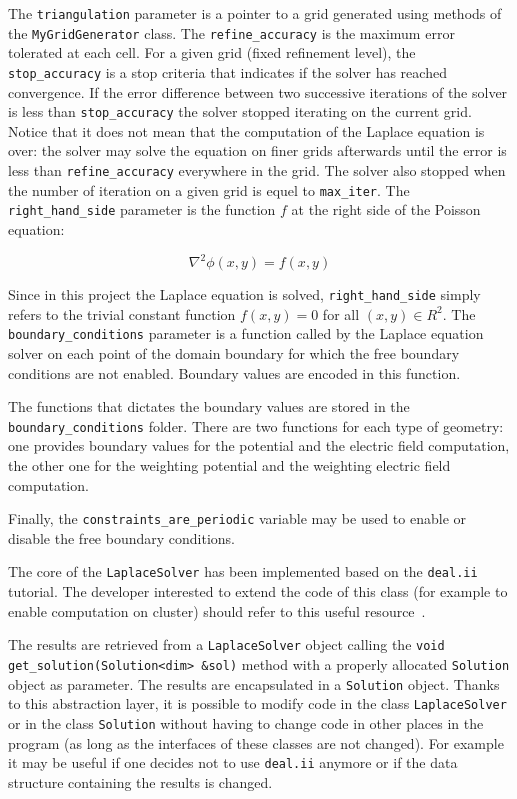\documentclass[11pt]{article}
\begin{document}
		The \texttt{triangulation} parameter is a pointer to a grid generated using methods of
		the \texttt{MyGridGenerator} class. The \texttt{refine\_accuracy} is the maximum
		error tolerated at each cell. For a given grid (fixed refinement level),
		the \texttt{stop\_accuracy}  is a stop criteria that indicates if the solver has
		reached convergence. If the error difference between two successive iterations
		of the solver is less than \texttt{stop\_accuracy} the solver stopped iterating
		on the current grid. Notice that it does not mean that the computation of the
		Laplace equation is over: the solver may solve the equation on finer grids
		afterwards until the error is less than \texttt{refine\_accuracy} everywhere
		in the grid. The solver also stopped when the number of iteration on a given
		grid is equel to \texttt{max\_iter}. The \texttt{right\_hand\_side} parameter
		is the function $f$ at the right side of the Poisson equation:

		\[\nabla^2 \phi(x,y) = f(x,y)\]

		Since in this project the Laplace equation is solved, \texttt{right\_hand\_side}
		simply refers to the trivial constant function $f(x,y) = 0$ for all $(x,y) \in R^2$.
		The \texttt{boundary\_conditions} parameter is a function called by the Laplace
		equation solver on each point of the domain boundary for which the free
		boundary conditions are not enabled. Boundary values are encoded in this function.

		The functions that dictates the boundary values are stored in the
		\texttt{boundary\_conditions} folder. There are two functions for each
		type of geometry: one provides boundary values for the potential and the electric
		field computation, the other one for the weighting potential and the weighting
		electric field computation.

		Finally, the \texttt{constraints\_are\_periodic} variable may be used to
		enable or disable the free boundary conditions.

		The core of the \texttt{LaplaceSolver} has been implemented based on the
		\texttt{deal.ii} tutorial. The developer interested to extend the code of this
		class (for example to enable computation on cluster) should refer to this
		useful resource~\cite{deal.iituto}.

		The results are retrieved from a \texttt{LaplaceSolver} object
		calling the \newline\lstinline{void get_solution(Solution<dim> &sol)}
		method with a properly allocated \texttt{Solution} object as parameter.
		The results are encapsulated in a \texttt{Solution} object. Thanks to this
		abstraction layer, it is possible to modify code in the class \texttt{LaplaceSolver}
		or in the class \texttt{Solution} without having to change code in other
		places in the program (as long as the interfaces of these classes are not
		changed). For example it may be useful if one decides not to use \texttt{deal.ii}
		anymore or if the data structure containing the results is changed.
\end{document}
